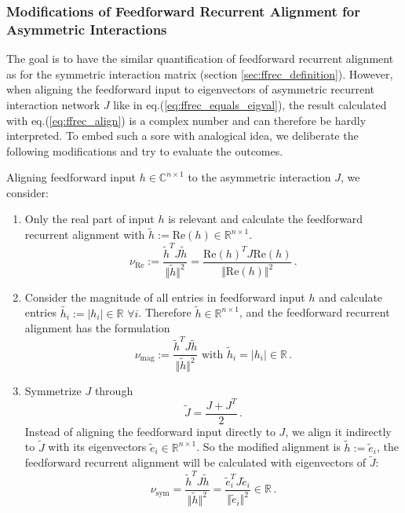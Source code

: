 \documentclass[11pt]{article}
\begin{document}
	\subsubsection{Modifications of Feedforward Recurrent Alignment for Asymmetric Interactions} \label{sec:modify_ffrec_alignment_score}
	The goal is to have the similar quantification of feedforward recurrent alignment as for the symmetric interaction matrix (section \ref{sec:ffrec_definition}). However, when aligning the feedforward input to eigenvectors of asymmetric recurrent interaction network $J$ like in eq.(\ref{eq:ffrec_equals_eigval}), the result calculated with eq.(\ref{eq:ffrec_align}) is a complex number and can therefore be hardly interpreted. To embed such a sore with analogical idea, we deliberate the following modifications and try to evaluate the outcomes. 
	
	Aligning feedforward input $h \in \mathbb{C}^{n \times 1}$ to the asymmetric interaction $J$, we consider:
		\begin{enumerate}
			\item \label{sec:modicication_real_part} Only the real part of input $h$ is relevant and calculate the feedforward recurrent alignment with $\tilde{h} := \text{Re}(h) \in \mathbb{R}^{n \times 1}$.
				\begin{equation} \label{eq:ffrec_real_part}
					\nu_{\text{Re}} := \frac{\tilde{h}^T J \tilde{h}}{\Vert \tilde{h} \Vert^2} = \frac{\text{Re}(h)^T J \text{Re}(h)}{\Vert \text{Re}(h)\Vert^2} \, .
				\end{equation}
			\item \label{sec:modification_magnitude} Consider the magnitude of all entries in feedforward input $h$ and calculate entries $\tilde{h_i} := \vert h_i \vert \in \mathbb{R} \, \, \forall i$. Therefore $\tilde{h} \in \mathbb{R}^{n \times 1}$, and the feedforward recurrent alignment has the formulation
				\begin{equation} \label{eq:ffrec_mag}
					\nu_{\text{mag}} := \frac{\tilde{h}^T J \tilde{h}}{\Vert \tilde{h} \Vert^2} \text{ with } \tilde{h}_i = \vert h_i \vert \in \mathbb{R} \, .
				\end{equation}
			\item \label{sec:modification_symmetrized} Symmetrize $J$ through
				\begin{equation} \label{eq:symmetrized_J}
					\tilde{J} = \frac{J + J^T}{2} \, .
				\end{equation}
				Instead of aligning the feedforward input directly to $J$, we align it indirectly to $\tilde{J}$ with its eigenvectors $\tilde{e}_i \in \mathbb{R}^{n \times 1}$. So the modified alignment is $\tilde{h} := \tilde{e}_i $, the feedforward recurrent alignment will be calculated with eigenvectors of $\tilde{J}$:
				\begin{equation} \label{eq:ffrec_symmetrized}
					\nu_{\text{sym}} =  \frac{\tilde{h}^T J \tilde{h}}{\Vert \tilde{h} \Vert^2} = \frac{\tilde{e}_i^T J \tilde{e}_i}{\Vert \tilde{e}_i \Vert^2} \in \mathbb{R} \, .
				\end{equation}
		\end{enumerate}
	
\end{document}
